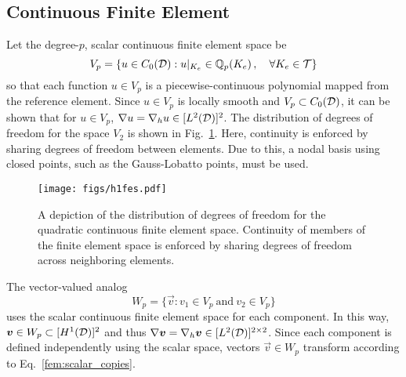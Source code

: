 \documentclass[../doc.tex]{subfiles}
\begin{document}
\subsection{Continuous Finite Element}
Let the degree-$p$, scalar continuous finite element space be
	\begin{equation}
		V_p = \{ u \in C_0(\mathcal{D}) : u|_{K_e} \in \mathbb{Q}_{p}(K_e) \,, \quad \forall K_e \in\mathcal{T} \} 
	\end{equation}
so that each function $u\in V_p$ is a piecewise-continuous polynomial mapped from the reference element. Since $u \in V_p$ is locally smooth and $V_p \subset C_0(\mathcal{D})$, it can be shown that for $u\in V_p$, $\nabla u = \nabla_h u \in [L^2(\mathcal{D})]^2$. The distribution of degrees of freedom for the space $V_2$ is shown in Fig.~\ref{fem:h1fes}. Here, continuity is enforced by sharing degrees of freedom between elements. Due to this, a nodal basis using closed points, such as the Gauss-Lobatto points, must be used. 
\begin{figure}
\centering
\texttt{[image: figs/h1fes.pdf]}
\caption{A depiction of the distribution of degrees of freedom for the quadratic continuous finite element space. Continuity of members of the finite element space is enforced by sharing degrees of freedom across neighboring elements.}
\label{fem:h1fes}
\end{figure}

The vector-valued analog 
	\begin{equation}
		W_p = \{ \vec{v} : v_1 \in V_p \ \mathrm{and} \ v_2 \in V_p \} 
	\end{equation}
uses the scalar continuous finite element space for each component. In this way, $\boldsymbol{v} \in W_p \subset [H^1(\mathcal{D})]^2$ and thus $\nabla\boldsymbol{v} = \nabla_h\boldsymbol{v} \in [L^2(\mathcal{D})]^{2\times 2}$. Since each component is defined independently using the scalar space, vectors $\vec{v} \in W_p$ transform according to Eq.~\ref{fem:scalar_copies}. 
\end{document}
